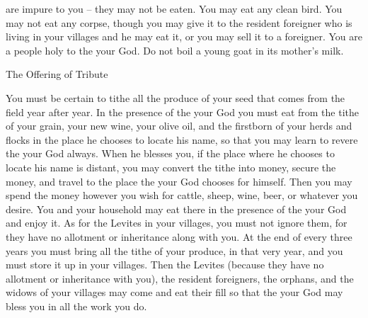 {are impure to you – they may not be eaten.
You may eat
any
clean
bird.
You may not
eat
any
corpse,
though you may give
it to the resident foreigner
who is living in your villages
and he may eat
it, or
you may sell
it to a foreigner.
You
are a people
holy
to the
{}
your God.
Do not
boil
a young goat
in its mother’s
milk.
\par }{\SH The Offering of Tribute
\par }{\PP {}You must be certain
to tithe
all
the produce
of your seed
that comes from
the field
year
after year.
In the presence
of the
{}
your God
you must eat
from the tithe
of your grain,
your new wine,
your olive oil,
and the firstborn
of your herds
and flocks
in the place
he chooses
to locate
his name,
so that
you may learn
to revere
the
{}
your God
always.
When
he blesses
you, if
the place
where
he chooses
to locate
his name
is distant,
you may
convert
the tithe into money,
secure the money,
and travel
to
the place
the {}
your God
chooses for himself.
Then you
may spend the money
however you
wish
for cattle,
sheep,
wine,
beer,
or whatever
you desire.
You
and your household
may eat
there
in the presence
of the {}
your God
and enjoy it.
As for the Levites
in your villages,
you must not
ignore
them, for
they have no
allotment
or inheritance
along with you.
At the end
of every three
years
you must bring
all
the tithe
of your produce,
in that
very
year,
and you must store
it up in your villages.
Then
the Levites
(because
they have no
allotment
or inheritance
with
you), the resident foreigners,
the orphans,
and the widows
of your villages
may come and eat
their fill
so that
the {}
your God
may bless
you in all
the work
you do.

}
